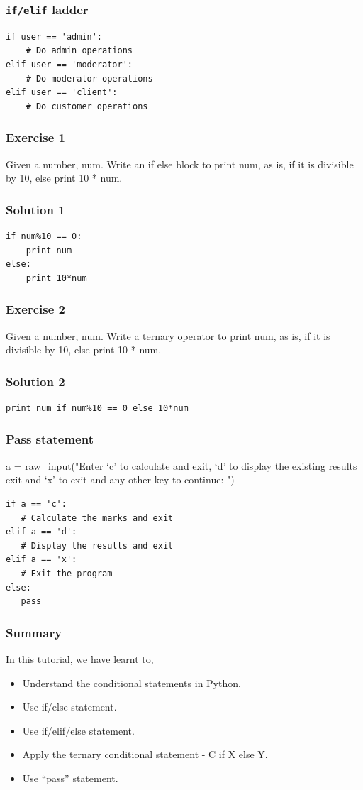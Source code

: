 \documentclass[presentation]{beamer}
\begin{document}
\begin{frame}[fragile]
\frametitle{\verb~if/elif~ ladder}
\label{sec-4}

\lstset{language=Python}
\begin{lstlisting}
if user == 'admin':
    # Do admin operations
elif user == 'moderator':
    # Do moderator operations
elif user == 'client':
    # Do customer operations
\end{lstlisting}
\end{frame}
\begin{frame}
\frametitle{Exercise 1}
\label{sec-5}

  Given a number, num. Write an if else block to print num, as is, if
  it is divisible by 10, else print 10 * num.
\end{frame}
\begin{frame}[fragile]
\frametitle{Solution 1}
\label{sec-6}

\lstset{language=Python}
\begin{lstlisting}
if num%10 == 0: 
    print num   
else:           
    print 10*num
\end{lstlisting}
\end{frame}
\begin{frame}
\frametitle{Exercise 2}
\label{sec-7}

  Given a number, num. Write a ternary operator to print num, as is,
  if it is divisible by 10, else print 10 * num.
\end{frame}
\begin{frame}[fragile]
\frametitle{Solution 2}
\label{sec-8}

\lstset{language=Python}
\begin{lstlisting}
print num if num%10 == 0 else 10*num
\end{lstlisting}
\end{frame}
\begin{frame}[fragile]
\frametitle{Pass statement}
\label{sec-9}

a = raw\_input("Enter `c' to calculate and exit, `d' to display the existing results exit and `x' to exit and any other key to continue: ")
\lstset{language=Python}
\begin{lstlisting}
if a == 'c':
   # Calculate the marks and exit
elif a == 'd':
   # Display the results and exit
elif a == 'x':
   # Exit the program
else:
   pass
\end{lstlisting}
\end{frame}
\begin{frame}
\frametitle{Summary}
\label{sec-10}

 In this tutorial, we have learnt to,


\begin{itemize}
\item Understand the conditional statements in Python.
\item Use if/else statement.
\item Use if/elif/else statement.
\item Apply the ternary conditional statement - C if X else Y.
\item Use ``pass'' statement.
\end{itemize}
\end{frame}
\end{document}

